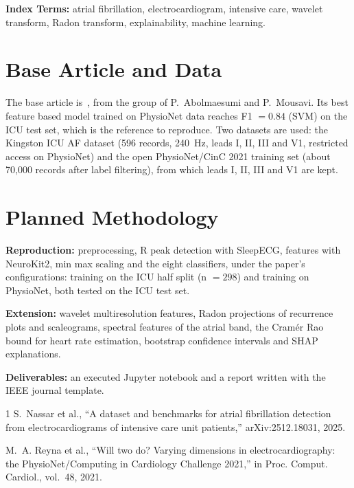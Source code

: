 \documentclass[journal]{IEEEtran}
\begin{document}
\medskip
\noindent\textbf{Index Terms:} atrial fibrillation, electrocardiogram, intensive care, wavelet transform, Radon transform, explainability, machine learning.

\section{Base Article and Data}
The base article is~\cite{nassar2025}, from the group of P.~Abolmaesumi and P.~Mousavi. Its best feature based model trained on PhysioNet data reaches F1 $=0.84$ (SVM) on the ICU test set, which is the reference to reproduce. Two datasets are used: the Kingston ICU AF dataset (596 records, 240~Hz, leads I, II, III and V1, restricted access on PhysioNet) and the open PhysioNet/CinC 2021 training set (about 70{,}000 records after label filtering), from which leads I, II, III and V1 are kept.

\section{Planned Methodology}
\textbf{Reproduction:} preprocessing, R peak detection with SleepECG, features with NeuroKit2, min max scaling and the eight classifiers, under the paper's configurations: training on the ICU half split (n $=298$) and training on PhysioNet, both tested on the ICU test set.

\textbf{Extension:} wavelet multiresolution features, Radon projections of recurrence plots and scaleograms, spectral features of the atrial band, the Cramér Rao bound for heart rate estimation, bootstrap confidence intervals and SHAP explanations.

\textbf{Deliverables:} an executed Jupyter notebook and a report written with the IEEE journal template.

\begin{thebibliography}{1}
S.~Nassar et al., ``A dataset and benchmarks for atrial fibrillation detection from electrocardiograms of intensive care unit patients,'' arXiv:2512.18031, 2025.

M.~A. Reyna et al., ``Will two do? Varying dimensions in electrocardiography: the PhysioNet/Computing in Cardiology Challenge 2021,'' in Proc. Comput. Cardiol., vol.~48, 2021.
\end{thebibliography}
\end{document}

